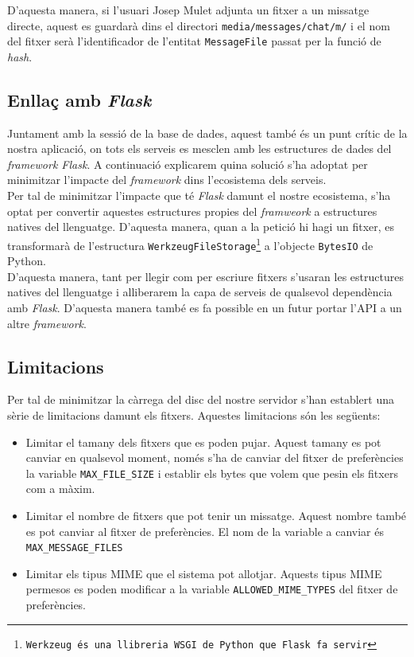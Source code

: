D'aquesta manera, si l'usuari Josep Mulet adjunta un fitxer a un missatge directe, aquest es guardarà dins el directori \texttt{media/messages/chat/m/} i el nom del fitxer serà l'identificador de l'entitat \texttt{MessageFile} passat per la funció de \emph{hash}.

\subsection{Enllaç amb \emph{Flask}}
Juntament amb la sessió de la base de dades, aquest també és un punt crític de la nostra aplicació, on tots els serveis es mesclen amb les estructures de dades del \emph{framework Flask}. A continuació explicarem quina solució s'ha adoptat per minimitzar l'impacte del \emph{framework} dins l'ecosistema dels serveis.\\

Per tal de minimitzar l'impacte que té \emph{Flask} damunt el nostre ecosistema, s'ha optat per convertir aquestes estructures propies del \emph{framweork} a estructures natives del llenguatge. D'aquesta manera, quan a la petició hi hagi un fitxer, es transformarà de l'estructura \texttt{WerkzeugFileStorage\footnote{Werkzeug és una llibreria WSGI de Python que Flask fa servir}} a l'objecte \texttt{BytesIO} de Python.\\

D'aquesta manera, tant per llegir com per escriure fitxers s'usaran les estructures natives del llenguatge i alliberarem la capa de serveis de qualsevol dependència amb \emph{Flask}. D'aquesta manera també es fa possible en un futur portar l'\ac{API} a un altre \emph{framework}. 

\subsection{Limitacions}
Per tal de minimitzar la càrrega del disc del nostre servidor s'han establert una sèrie de limitacions damunt els fitxers. Aquestes limitacions són les següents:

\begin{itemize}
	\item Limitar el tamany dels fitxers que es poden pujar. Aquest tamany es pot canviar en qualsevol moment, només s'ha de canviar del fitxer de preferències la variable \verb$MAX_FILE_SIZE$ i establir els bytes que volem que pesin els fitxers com a màxim.
	\item Limitar el nombre de fitxers que pot tenir un missatge. Aquest nombre també es pot canviar al fitxer de preferències. El nom de la variable a canviar és \verb$MAX_MESSAGE_FILES$
	\item Limitar els tipus \ac{MIME} que el sistema pot allotjar. Aquests tipus \ac{MIME} permesos es poden modificar a la variable \verb$ALLOWED_MIME_TYPES$ del fitxer de preferències.
\end{itemize}
	
